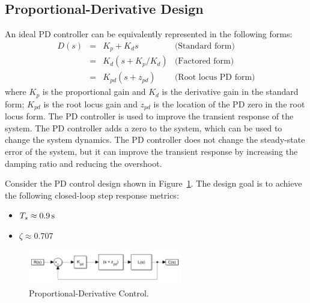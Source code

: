 \documentclass[11pt]{article}
\begin{document}
\subsection{Proportional-Derivative Design}
An ideal PD controller can be equivalently represented in the following forms:
\[
\begin{array}{rcll}
D(s) & = & K_p + K_d s & \text{(Standard form)} \\
  & = & K_d \left(s + {K_p}/{K_d}\right) & \text{(Factored form)} \\
  & = & K_{pd} (s + z_{pd}) & \text{(Root locus PD form)}
\end{array}
\]
where $K_p$ is the proportional gain and $K_d$ is the derivative gain in the standard form; $K_{pd}$ is the root locus gain and $z_{pd}$ is the location of the PD zero in the root locus form.  The PD controller is used to improve the transient response of the system.  The PD controller adds a zero to the system, which can be used to change the system dynamics.  The PD controller does not change the steady-state error of the system, but it can improve the transient response by increasing the damping ratio and reducing the overshoot.

Consider the PD control design shown in Figure~\ref{f:pd}. The design goal is to achieve the following closed-loop step response metrics:
\begin{itemize}
\item $T_s \approx \unit[0.9]{s}$
\item $\zeta \approx 0.707$
\end{itemize}


\begin{figure}[hbt!]
\centering  
\includegraphics [width=0.6\textwidth]{pd_control.png}
\caption{Proportional-Derivative Control.}
\label{f:pd}
\end{figure}
\end{document}
